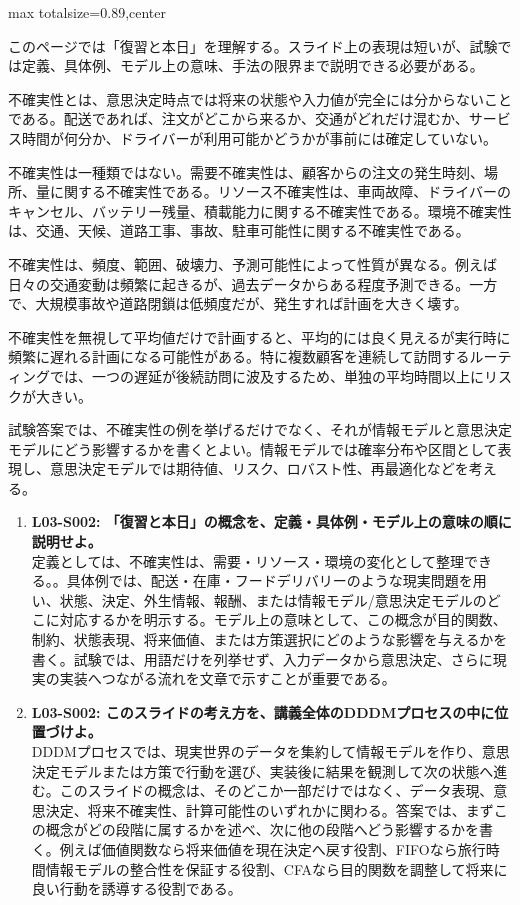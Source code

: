 \begin{minipage}[t]{0.58\textwidth}
\begin{adjustbox}{max totalsize={\textwidth}{0.89\textheight},center}
\begin{minipage}{\textwidth}\scriptsize
{}このページでは「復習と本日」を理解する。スライド上の表現は短いが、試験では定義、具体例、モデル上の意味、手法の限界まで説明できる必要がある。\par
不確実性とは、意思決定時点では将来の状態や入力値が完全には分からないことである。配送であれば、注文がどこから来るか、交通がどれだけ混むか、サービス時間が何分か、ドライバーが利用可能かどうかが事前には確定していない。\par
不確実性は一種類ではない。需要不確実性は、顧客からの注文の発生時刻、場所、量に関する不確実性である。リソース不確実性は、車両故障、ドライバーのキャンセル、バッテリー残量、積載能力に関する不確実性である。環境不確実性は、交通、天候、道路工事、事故、駐車可能性に関する不確実性である。\par
不確実性は、頻度、範囲、破壊力、予測可能性によって性質が異なる。例えば日々の交通変動は頻繁に起きるが、過去データからある程度予測できる。一方で、大規模事故や道路閉鎖は低頻度だが、発生すれば計画を大きく壊す。\par
不確実性を無視して平均値だけで計画すると、平均的には良く見えるが実行時に頻繁に遅れる計画になる可能性がある。特に複数顧客を連続して訪問するルーティングでは、一つの遅延が後続訪問に波及するため、単独の平均時間以上にリスクが大きい。\par
試験答案では、不確実性の例を挙げるだけでなく、それが情報モデルと意思決定モデルにどう影響するかを書くとよい。情報モデルでは確率分布や区間として表現し、意思決定モデルでは期待値、リスク、ロバスト性、再最適化などを考える。\par{}\begin{enumerate}\item \textbf{L03-S002: 「復習と本日」の概念を、定義・具体例・モデル上の意味の順に説明せよ。}\\定義としては、不確実性は、需要・リソース・環境の変化として整理できる。。具体例では、配送・在庫・フードデリバリーのような現実問題を用い、状態、決定、外生情報、報酬、または情報モデル/意思決定モデルのどこに対応するかを明示する。モデル上の意味として、この概念が目的関数、制約、状態表現、将来価値、または方策選択にどのような影響を与えるかを書く。試験では、用語だけを列挙せず、入力データから意思決定、さらに現実の実装へつながる流れを文章で示すことが重要である。\item \textbf{L03-S002: このスライドの考え方を、講義全体のDDDMプロセスの中に位置づけよ。}\\DDDMプロセスでは、現実世界のデータを集約して情報モデルを作り、意思決定モデルまたは方策で行動を選び、実装後に結果を観測して次の状態へ進む。このスライドの概念は、そのどこか一部だけではなく、データ表現、意思決定、将来不確実性、計算可能性のいずれかに関わる。答案では、まずこの概念がどの段階に属するかを述べ、次に他の段階へどう影響するかを書く。例えば価値関数なら将来価値を現在決定へ戻す役割、FIFOなら旅行時間情報モデルの整合性を保証する役割、CFAなら目的関数を調整して将来に良い行動を誘導する役割である。\end{enumerate}

\end{minipage}
\end{adjustbox}
\end{minipage}
